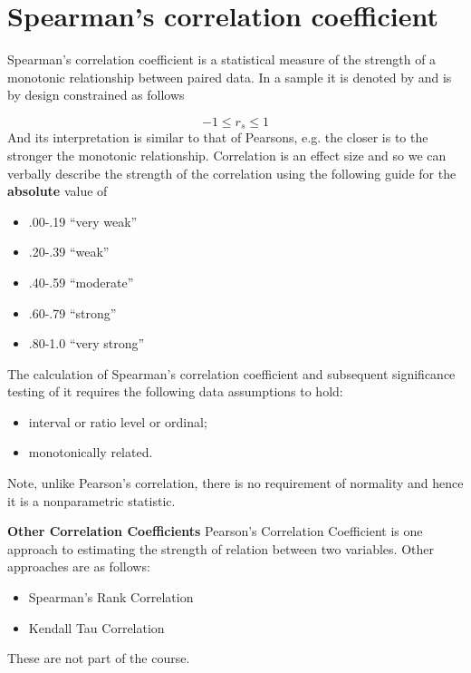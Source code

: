 
\section{Spearman’s correlation coefficient }

Spearman’s correlation coefficient is a statistical measure of the strength of a 
monotonic relationship between paired data. In a sample it is denoted by 
and is by 
design constrained as follows 

\[ -1 \leq r_s \leq 1 \]
And its interpretation is similar to that of Pearsons, e.g. the closer 
is to the stronger the monotonic relationship. Correlation is an effect size and so we can verbally describe the strength of the correlation using the following guide for the 
\textbf{absolute} value of 

\begin{itemize}
	\item .00-.19 “very weak” 
	\item .20-.39 “weak” 
	\item .40-.59 “moderate” 
	\item .60-.79 “strong” 
	\item .80-1.0 “very strong” 
\end{itemize}

The calculation of Spearman’s correlation coefficient and subsequent significance 
testing of it requires the following data assumptions to hold: 

\begin{itemize}
	\item interval or ratio level or ordinal; 
	\item monotonically related. 
\end{itemize}

Note, unlike Pearson’s correlation, there is no requirement of normality and hence it 
is a nonparametric statistic. 





	\noindent \textbf{Other Correlation Coefficients}
	Pearson's Correlation Coefficient is one approach to estimating the strength of relation between two variables.
	Other approaches are as follows:
	\begin{itemize}
		\item Spearman's Rank Correlation
		\item Kendall Tau Correlation
	\end{itemize}
	These are not part of the course.



